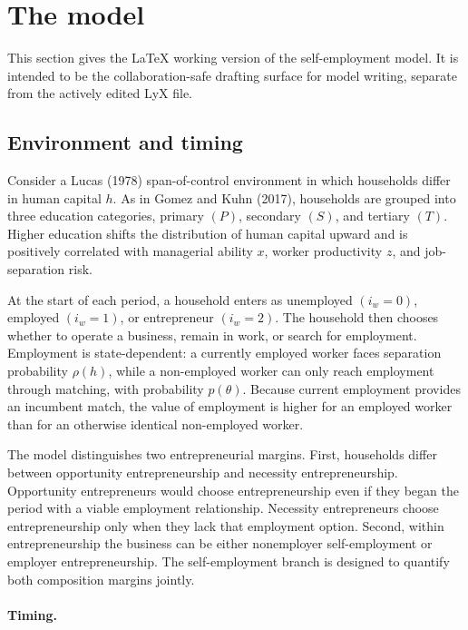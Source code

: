 \section{The model}

This section gives the LaTeX working version of the self-employment model.
It is intended to be the collaboration-safe drafting surface for model writing,
separate from the actively edited LyX file.

\subsection{Environment and timing}

Consider a Lucas (1978) span-of-control environment in which households differ
in human capital $h$. As in Gomez and Kuhn (2017), households are grouped into
three education categories, primary $(P)$, secondary $(S)$, and tertiary $(T)$.
Higher education shifts the distribution of human capital upward and is
positively correlated with managerial ability $x$, worker productivity $z$, and
job-separation risk.

At the start of each period, a household enters as unemployed $(i_w = 0)$,
employed $(i_w = 1)$, or entrepreneur $(i_w = 2)$. The household then chooses
whether to operate a business, remain in work, or search for employment.
Employment is state-dependent: a currently employed worker faces separation
probability $\rho(h)$, while a non-employed worker can only reach employment
through matching, with probability $p(\theta)$. Because current employment
provides an incumbent match, the value of employment is higher for an employed
worker than for an otherwise identical non-employed worker.

The model distinguishes two entrepreneurial margins. First, households differ
between opportunity entrepreneurship and necessity entrepreneurship. Opportunity
entrepreneurs would choose entrepreneurship even if they began the period with a
viable employment relationship. Necessity entrepreneurs choose entrepreneurship
only when they lack that employment option. Second, within entrepreneurship the
business can be either nonemployer self-employment or employer
entrepreneurship. The self-employment branch is designed to quantify both
composition margins jointly.

\paragraph{Timing.}

